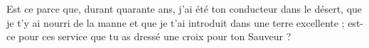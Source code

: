 Est ce parce que, durant quarante ans, j’ai été ton conducteur dans le désert, que je t’y ai nourri de la manne et que je t’ai introduit dans une terre excellente ; est-ce pour ces service que tu as dressé une croix pour ton Sauveur ?
